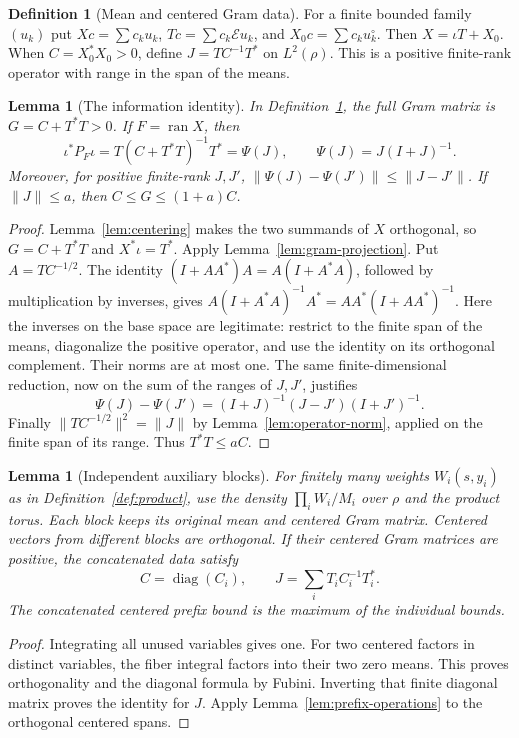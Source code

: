 \documentclass[reqno,a4paper,12pt]{amsart}
\newtheorem{lemma}[theorem]{Lemma}
\theoremstyle{definition}
\newtheorem{definition}[theorem]{Definition}
\newcommand{\diag}{\operatorname{diag}}
\newcommand{\ran}{\operatorname{ran}}
\begin{document}
\begin{definition}[Mean and centered Gram data]\label{def:information}
For a finite bounded family $(u_k)$ put
$Xc=\sum c_ku_k$, $Tc=\sum c_k\mathcal Eu_k$, and
$X_0c=\sum c_ku_k^\circ$. Then $X=\iota T+X_0$.
When $C=X_0^*X_0>0$, define $J=TC^{-1}T^*$ on $L^2(\rho)$.
This is a positive finite-rank operator with range in the span of
the means.
\end{definition}

\begin{lemma}[The information identity]\label{lem:information}
In Definition~\ref{def:information}, the full Gram matrix is
$G=C+T^*T>0$. If $F=\ran X$, then
\[
 \iota^*P_F\iota=T(C+T^*T)^{-1}T^*=\Psi(J),\qquad
 \Psi(J)=J(I+J)^{-1}.
\]
Moreover, for positive finite-rank $J,J'$,
$\|\Psi(J)-\Psi(J')\|\le\|J-J'\|$.
If $\|J\|\le a$, then $C\le G\le(1+a)C$.
\end{lemma}
\begin{proof}
Lemma~\ref{lem:centering} makes the two summands of $X$ orthogonal,
so $G=C+T^*T$ and $X^*\iota=T^*$. Apply
Lemma~\ref{lem:gram-projection}. Put $A=TC^{-1/2}$. The identity
$(I+AA^*)A=A(I+A^*A)$, followed by multiplication by inverses, gives
$A(I+A^*A)^{-1}A^*=AA^*(I+AA^*)^{-1}$.
Here the inverses on the base space are legitimate: restrict to the
finite span of the means, diagonalize the positive operator, and use
the identity on its orthogonal complement. Their norms are at most one.
The same finite-dimensional reduction, now on the sum of the ranges
of $J,J'$, justifies
\[
 \Psi(J)-\Psi(J')=(I+J)^{-1}(J-J')(I+J')^{-1}.
\]
Finally $\|TC^{-1/2}\|^2=\|J\|$ by
Lemma~\ref{lem:operator-norm}, applied on the finite span of its range.
Thus $T^*T\le aC$.
\end{proof}

\begin{lemma}[Independent auxiliary blocks]\label{lem:independent-blocks}
For finitely many weights $W_i(s,y_i)$ as in Definition~\ref{def:product},
use the density $\prod_i W_i/M_i$ over $\rho$ and the product torus.
Each block keeps its original mean and centered Gram matrix.
Centered vectors from different blocks are orthogonal. If their
centered Gram matrices are positive, the concatenated data satisfy
\[
 C=\diag(C_i),\qquad J=\sum_i T_iC_i^{-1}T_i^*.
\]
The concatenated centered prefix bound is the maximum of the
individual bounds.
\end{lemma}
\begin{proof}
Integrating all unused variables gives one. For two centered factors
in distinct variables, the fiber integral factors into their two
zero means. This proves orthogonality and the diagonal formula by
Fubini. Inverting that finite diagonal matrix proves the identity
for $J$. Apply Lemma~\ref{lem:prefix-operations} to the orthogonal
centered spans.
\end{proof}
\end{document}
